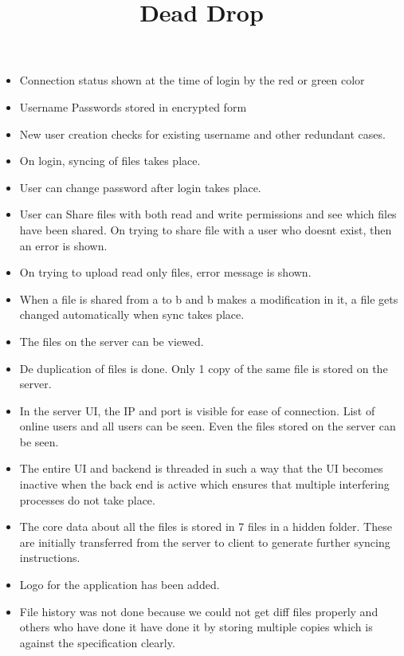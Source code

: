 \documentclass[12pt]{article}
\begin{document}
\title{Dead Drop}
\author{}
\date{}
\maketitle

\thispagestyle{empty}
\pagestyle{empty}

\begin{itemize}
	\item Connection status shown at the time of login by the red or green color
	\item Username Passwords stored in encrypted form
	\item New user creation checks for existing username and other redundant cases.
	\item On login, syncing of files takes place.
	\item User can change password after login takes place.
	\item User can Share files with both read and write permissions and see which files have been shared. On trying to share file with a user who doesnt exist, then an error is shown.
	\item On trying to upload read only files, error message is shown. 
	\item When a file is shared from a to b and b makes a modification in it, a file gets changed automatically when sync takes place.
	\item The files on the server can be viewed.
	\item De duplication of files is done. Only 1 copy of the same file is stored on the server.
	\item In the server UI, the IP and port is visible for ease of connection. List of online users and all users can be seen. Even the files stored on the server can be seen.
	\item The entire UI and backend is threaded in such a way that the UI becomes inactive when the back end is active which ensures that multiple interfering processes do not take place.
	\item The core data about all the files is stored in 7 files in a hidden folder. These are initially transferred from the server to client to generate further syncing instructions.
	\item Logo for the application has been added.
	\item File history was not done because we could not get diff files properly and others who have done it have done it by storing multiple copies which is against the specification clearly.
	
\end{itemize}
\end{document}
